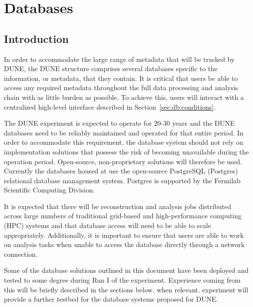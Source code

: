 \documentclass[../main-v1.tex]{subfiles}
\begin{document}
\chapter{Databases }
\label{ch:db}

\section{Introduction   }
\label{sec:db:intro} 

In order to accommodate the large range of metadata that will be tracked by DUNE, the DUNE  structure comprises several databases specific to the information, or metadata, that they contain. It is critical that users be able to access any required metadata throughout the full data processing and analysis chain with as little burden as possible. To achieve this, users will interact with a centralized high-level interface   described in Section~\ref{sec:db:conditions}.

The DUNE experiment is expected to operate for 20-30 years and the DUNE databases need to be reliably maintained and operated for that entire period. In order to accommodate this requirement, the database system should not rely on implementation solutions that possess the risk of becoming unavailable during the operation period. Open-source, non-proprietary solutions will therefore be used. Currently the databases housed at  use the open-source PostgreSQL (Postgres) relational database management system. Postgres is supported by the Fermilab Scientific Computing Division.       

It is expected that there will be reconstruction and analysis jobs distributed across large numbers of traditional grid-based and high-performance computing (HPC) systems and that database access will need to be able to scale appropriately. Additionally, it is important to ensure that users are able to work on analysis tasks when unable to access the database directly through a network connection. 

Some of the database solutions outlined in this document have been deployed and tested to some degree during Run I of the  experiment. Experience coming from %
this will be briefly described in the sections below, when relevant. %
 experiment will provide a further testbed for the database systems proposed for DUNE.  
\end{document}
